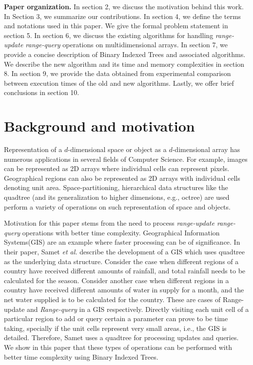 \documentclass[a4paper]{article}
\begin{document}
\vspace{2 mm}
\noindent
\textbf{Paper organization.} In section 2, we discuss the motivation behind this work. In Section 3, we summarize our contributions. In section 4, we define the terms and notations used in this paper. We give the formal problem statement in section 5. In section 6, we discuss the existing algorithms for handling \textit{range-update range-query} operations on multidimensional arrays. In section 7, we provide a concise description of Binary Indexed Trees and associated algorithms. We describe the new algorithm and its time and memory complexities in section 8. In section 9, we provide the data obtained from experimental comparison between execution times of the old and new algorithms. Lastly, we offer brief conclusions in section 10.



\section{Background and motivation}
Representation of a $d$-dimensional space or object as a $d$-dimensional array has numerous applications in several fields of Computer Science. For example, images can be represented as 2D arrays where individual cells can represent pixels. Geographical regions can also be represented as 2D arrays with individual cells denoting unit area. Space-partitioning, hierarchical data structures like the quadtree (and its generalization to higher dimensions, e.g., octree) are used perform a variety of operations on such representation of space and objects\cite{HS2}.

\vspace{2 mm}
Motivation for this paper stems from the need to process \textit{range-update range-query} operations with better time complexity. Geographical Information Systems(GIS) are an example where faster processing can be of significance.  In their paper\cite{GIS}, Samet \textit{et al.} describe the development of a GIS which uses quadtree as the underlying data structure. Consider the case when different regions of a country have received different amounts of rainfall, and total rainfall needs to be calculated for the season. Consider another case when different regions in a country have received different amounts of water in supply for a month, and the net water supplied is to be calculated for the country. These are cases of Range-update and \textit{Range-query} in a GIS respectively. Directly visiting each unit cell of a particular region to add or query certain a parameter can prove to be time taking, specially if the unit cells represent very small areas, i.e., the GIS is detailed. Therefore, Samet uses a quadtree for processing updates and queries. We show in this paper that these types of operations can be performed with better time complexity using Binary Indexed Trees.
\end{document}
